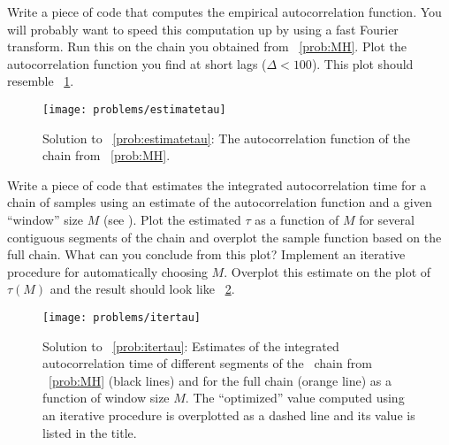 \documentclass[modern]{aastex61}
\newcommand{\MCMC}{\acronym{MCMC}}
\begin{document}
\begin{problem}\label{prob:estimatetau}
Write a piece of code that computes the empirical autocorrelation
function.
You will probably want to speed this computation up by using a fast Fourier
transform.
Run this on the chain you obtained from \problemname~\ref{prob:MH}.
Plot the autocorrelation function you find at short lags ($\Delta < 100$).
This plot should resemble \figurename~\ref{fig:estimatetau}.
\end{problem}

\begin{figure}[!htbp]
\begin{center}
\texttt{[image: problems/estimatetau]}
\end{center}
\caption{Solution to \problemname~\ref{prob:estimatetau}:
The autocorrelation function of the chain from \problemname~\ref{prob:MH}.}
\label{fig:estimatetau}
\end{figure}

\begin{problem}\label{prob:itertau}
Write a piece of code that estimates the integrated autocorrelation time for a
chain of samples using an estimate of the autocorrelation function and a given
``window'' size $M$ (see \citealt{sokal}).
Plot the estimated $\tau$ as a function of $M$ for several contiguous segments
of the chain and overplot the sample function based on the full chain.
What can you conclude from this plot?
Implement an iterative procedure for automatically choosing $M$.
Overplot this estimate on the plot of $\tau(M)$ and the result should look
like \figurename~\ref{fig:itertau}.
\end{problem}

\begin{figure}[!htbp]
\begin{center}
\texttt{[image: problems/itertau]}
\end{center}
\caption{Solution to \problemname~\ref{prob:itertau}:
Estimates of the integrated autocorrelation time of different segments of the
\MCMC\ chain from \problemname~\ref{prob:MH} (black lines) and for the full
chain (orange line) as a function of window size $M$.
The ``optimized'' value computed using an iterative procedure is overplotted
as a dashed line and its value is listed in the title.}
\label{fig:itertau}
\end{figure}
\end{document}
